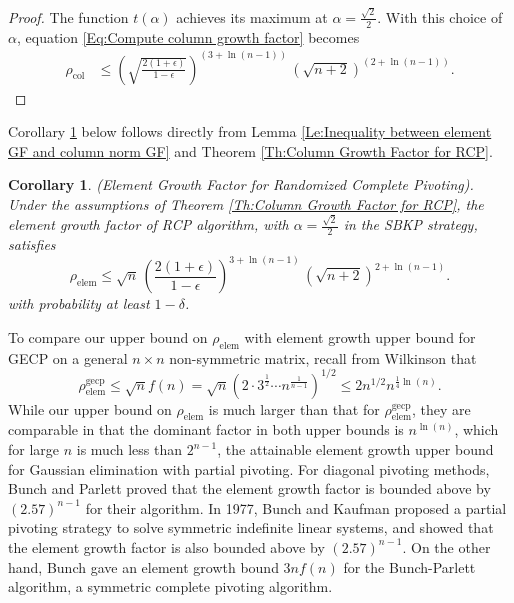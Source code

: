 \documentclass[11pt]{article}
\newtheorem{corollary}{Corollary}[section]
\begin{document}
\begin{proof}
The function $t(\alpha)$ achieves its maximum at $\alpha = \frac{\sqrt{2}}{2}$. With this choice of $\alpha$, equation \eqref{Eq:Compute column growth factor} becomes
\begin{align} \label{Eq: Column growth factor bound}
\rho_{\textrm{col}} & \le \left(\sqrt{\frac{2(1 + \epsilon)}{1 - \epsilon}}\right)^{\left(3 + \ln(n - 1) \right)} \,  
\left(\sqrt{n+2}\right)^{\left(2 + \ln(n - 1) \right)}.
\end{align}
\end{proof}

Corollary \ref{Cor:Element Growth Factor for RCP} below follows directly from Lemma \ref{Le:Inequality between element GF and column norm GF} and Theorem \ref{Th:Column Growth Factor for RCP}.

\begin{corollary}\label{Cor:Element Growth Factor for RCP}
(Element Growth Factor for Randomized Complete Pivoting). Under the assumptions of Theorem \ref{Th:Column Growth Factor for RCP}, the element growth factor of RCP algorithm, with $\alpha = \frac{\sqrt{2}}{2}$ in the SBKP strategy, satisfies
\begin{equation*}
   \rho_{\textrm{elem}} \le \sqrt{n}\, \left(\frac{2(1 + \epsilon)}{1 - \epsilon}\right)^{3 + \ln(n-1)} \, \left(\sqrt{n+2}\right)^{2 + \ln(n-1)}. 
   \end{equation*}
with probability at least $1-\delta$. 
\end{corollary}

To compare our upper bound on $\rho_{\textrm{elem}}$ with 
element growth upper bound for GECP on a general $n\times n$ non-symmetric matrix, recall from Wilkinson \cite{wilkinson1961error} that 
\begin{equation*}
\rho^{\textrm{gecp}}_{\textrm{elem}} \le \sqrt{n} f(n) = \sqrt{n} \left( 2 \cdot 3^{\frac{1}{2}} \cdots n^{\frac{1}{n - 1}} \right)^{1/2} \le 2 n^{1/2} n^{\frac{1}{4} \ln(n)}.
\end{equation*}
\noindent While our upper bound on $\rho_{\textrm{elem}}$ is much larger than that for $\rho^{\textrm{gecp}}_{\textrm{elem}}$, they are comparable in that the dominant factor in both upper bounds is $n^{\ln(n)}$, which for large $n$ is much less than $2^{n-1}$, the attainable element growth upper bound for Gaussian elimination with partial pivoting. For diagonal pivoting methods, Bunch and Parlett \cite{bunch1971direct} proved that the element growth factor is bounded above by $(2.57)^{n-1}$ for their algorithm. In 1977, Bunch and Kaufman \cite{bunch1977some} proposed a partial pivoting strategy to solve symmetric indefinite linear systems, and showed that the element growth factor is also bounded above by $(2.57)^{n - 1}$. On the other hand, Bunch \cite{bunch1971analysis} gave an element growth bound $3nf(n)$ for the Bunch-Parlett algorithm, a symmetric complete pivoting algorithm.  
\end{document}

